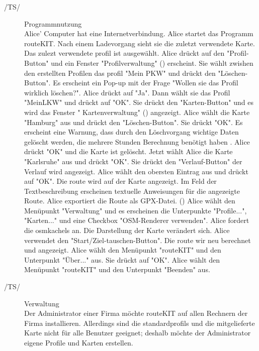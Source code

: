 \documentclass[a4paper, 11pt]{article}
\makeatletter
\def\namedlabel#1#2{\begingroup
    #2%
    \def\@currentlabel{#2}%
    \phantomsection\label{#1}\endgroup
}
\newcommand{\oitem}[2]{
  \@ifundefined{c@oitem#1}{\newcounter{oitem#1}}{} %
  \addtocounter{oitem#1}{10}
  \item[\namedlabel{#1:#2}{/#1\arabic{oitem#1}/}]
}
\makeatother
\begin{document}
\begin{description}
\oitem{TS}{programmnutzung} Programmnutzung\\
Alice' Computer hat eine Internetverbindung. Alice startet das Programm routeKIT.  Nach einem Ladevorgang sieht sie die zuletzt verwendete Karte. Das zulezt verwendete \gls{profil} ist ausgewählt. Alice drückt auf den "Profil- Button" und ein Fenster "Profilverwaltung"  () erscheint. Sie wählt zwishen den erstellten Profilen das \gls{profil} "Mein PKW" und drückt den "Löschen-Button". Es erscheint ein Pop-up mit der Frage "Wollen sie das Profil wirklich löschen?". Alice drückt auf "Ja". Dann wählt sie das Profil "MeinLKW" und drückt auf "OK". Sie drückt den "Karten-Button" und es wird das Fenster " Kartenverwaltung" () angezeigt. Alice wählt die Karte "Hamburg" aus und drückt den "Löschen-Button". Sie drückt "OK". Es erscheint eine Warnung, dass durch den Löschvorgang wichtige Daten gelöscht werden, die mehrere Stunden Berechnung benötigt haben . Alice drückt "OK" und die Karte ist gelöscht. Jetzt wählt Alice die Karte "Karlsruhe" aus und drückt "OK". Sie drückt den "Verlauf-Button" der Verlauf wird angezeigt. Alice wählt den obersten Eintrag aus und drückt auf "OK". Die \gls{route} wird auf der Karte angezeigt. Im Feld der Textbeschreibung erscheinen textuelle Anweisungen für die angezeigte Route. Alice exportiert die Route als GPX-Datei. () Alice wählt den Menüpunkt "Verwaltung" und es erscheinen die Unterpunkte "Profile...", "Karten..." und  eine Checkbox "OSM-Renderer verwenden". Alice fordert die \glspl{osmkachel} an. Die Darstellung der Karte verändert sich. Alice verwendet den "Start/Ziel-tauschen-Button". Die \gls{route} wir neu berechnet und angezeigt. Alice wählt den  Menüpunkt "routeKIT" und den Unterpunkt "Über..." aus. Sie drückt auf "OK". Alice wählt den  Menüpunkt "routeKIT" und den Unterpunkt "Beenden" aus.

\oitem{TS}{verwaltung} Verwaltung\\
Der Administrator einer Firma möchte routeKIT auf allen Rechnern der Firma installieren. Allerdings sind die \glspl{standardprofil} und die mitgelieferte Karte nicht für alle Benutzer geeignet; deshalb möchte der Administrator eigene Profile und Karten erstellen.


\end{description}
\end{document}
